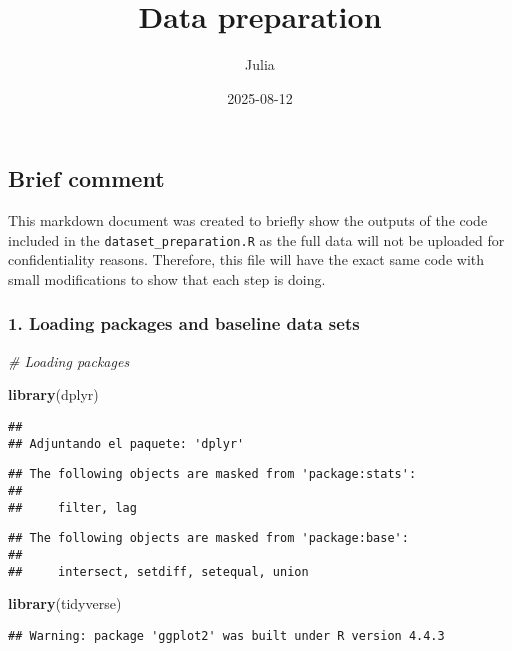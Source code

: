 \documentclass[
]{article}
\title{Data preparation}
\author{Julia}
\date{2025-08-12}
\newenvironment{Shaded}{\begin{snugshade}}{\end{snugshade}}
\newcommand{\CommentTok}[1]{\textcolor[rgb]{0.56,0.35,0.01}{\textit{#1}}}
\newcommand{\FunctionTok}[1]{\textcolor[rgb]{0.13,0.29,0.53}{\textbf{#1}}}
\newcommand{\NormalTok}[1]{#1}
\begin{document}
\maketitle

\subsection{Brief comment}\label{brief-comment}

This markdown document was created to briefly show the outputs of the
code included in the \texttt{dataset\_preparation.R} as the full data
will not be uploaded for confidentiality reasons. Therefore, this file
will have the exact same code with small modifications to show that each
step is doing.

\subsubsection{1. Loading packages and baseline data
sets}\label{loading-packages-and-baseline-data-sets}

\begin{Shaded}
\begin{Highlighting}[]
\CommentTok{\# Loading packages}

\FunctionTok{library}\NormalTok{(dplyr)  }
\end{Highlighting}
\end{Shaded}

\begin{verbatim}
## 
## Adjuntando el paquete: 'dplyr'
\end{verbatim}

\begin{verbatim}
## The following objects are masked from 'package:stats':
## 
##     filter, lag
\end{verbatim}

\begin{verbatim}
## The following objects are masked from 'package:base':
## 
##     intersect, setdiff, setequal, union
\end{verbatim}

\begin{Shaded}
\begin{Highlighting}[]
\FunctionTok{library}\NormalTok{(tidyverse)}
\end{Highlighting}
\end{Shaded}

\begin{verbatim}
## Warning: package 'ggplot2' was built under R version 4.4.3
\end{verbatim}
\end{document}
